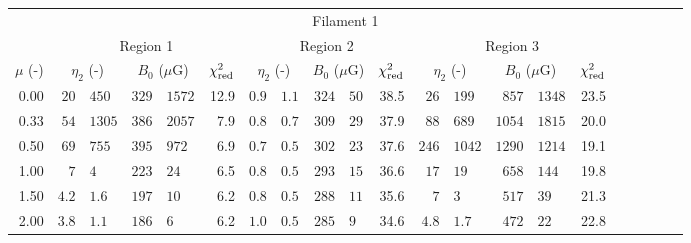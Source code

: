 \begin{tabular}{@{}r r@{ $\pm$ }lr@{ $\pm$ }lr
                     r@{ $\pm$ }lr@{ $\pm$ }lr
                     r@{ $\pm$ }lr@{ $\pm$ }lr
                     r@{ $\pm$ }lr@{ $\pm$ }lr@{}}

\toprule
\multicolumn{21}{c}{Filament 1} \\
\cmidrule{1-21}
{} & \multicolumn{5}{c}{Region 1}
   & \multicolumn{5}{c}{Region 2}
   & \multicolumn{5}{c}{Region 3} \\
\cmidrule(lr){2-6} \cmidrule(lr){7-11} \cmidrule(lr){12-16}
$\mu$ (-) & \multicolumn{2}{c}{$\eta_2$ (-)}
          & \multicolumn{2}{c}{$B_0$ ($\mu$G)} & $\chi^2_{\mathrm{red}}$
          & \multicolumn{2}{c}{$\eta_2$ (-)}
          & \multicolumn{2}{c}{$B_0$ ($\mu$G)} & $\chi^2_{\mathrm{red}}$
          & \multicolumn{2}{c}{$\eta_2$ (-)}
          & \multicolumn{2}{c}{$B_0$ ($\mu$G)} & $\chi^2_{\mathrm{red}}$ \\
\cmidrule{1-16}
0.00 & $20$ & $450$ & $329$ & $1572$ & 12.9
     & $0.9$ & $1.1$ & $324$ & $50$ & 38.5
     & $26$ & $199$ & $857$ & $1348$ & 23.5 \\
0.33 & $54$ & $1305$ & $386$ & $2057$ & 7.9
     & $0.8$ & $0.7$ & $309$ & $29$ & 37.9
     & $88$ & $689$ & $1054$ & $1815$ & 20.0 \\
0.50 & $69$ & $755$ & $395$ & $972$ & 6.9
     & $0.7$ & $0.5$ & $302$ & $23$ & 37.6
     & $246$ & $1042$ & $1290$ & $1214$ & 19.1 \\
1.00 & $7$ & $4$ & $223$ & $24$ & 6.5
     & $0.8$ & $0.5$ & $293$ & $15$ & 36.6
     & $17$ & $19$ & $658$ & $144$ & 19.8 \\
1.50 & $4.2$ & $1.6$ & $197$ & $10$ & 6.2
     & $0.8$ & $0.5$ & $288$ & $11$ & 35.6
     & $7$ & $3$ & $517$ & $39$ & 21.3 \\
2.00 & $3.8$ & $1.1$ & $186$ & $6$ & 6.2
     & $1.0$ & $0.5$ & $285$ & $9$ & 34.6
     & $4.8$ & $1.7$ & $472$ & $22$ & 22.8 \\


\end{tabular}
